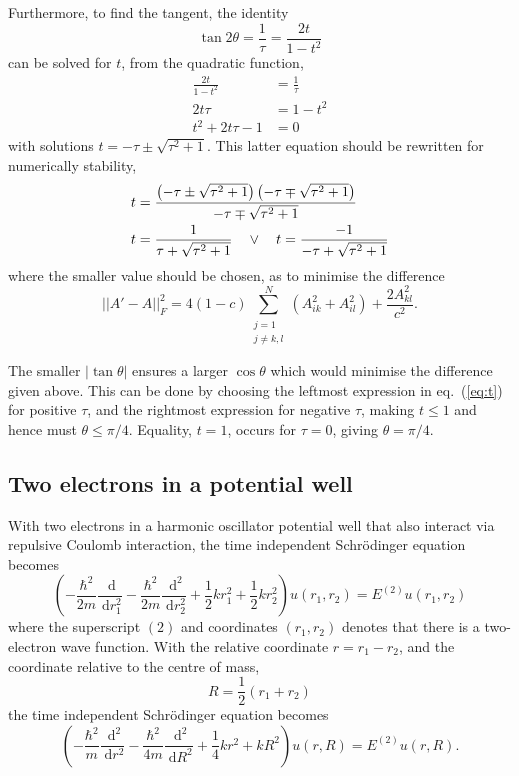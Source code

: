 \documentclass[a4paper,11pt]{article}
\newcommand{\diff}{\ensuremath{\; \text{d}}}
\begin{document}
Furthermore, to find the tangent, the identity
\[ \tan 2\theta = \frac{1}{\tau} = \frac{2 t}{1 - t^2} \]
can be solved for $t$, from the quadratic function,
\begin{align*}
    \frac{2t}{1 - t^2} &= \frac{1}{\tau}  \\
    2t\tau &= 1 - t^2 \\
    t^2 + 2t \tau - 1 &= 0
\end{align*}
with solutions $t = -\tau \pm \sqrt{\tau^2 + 1}$. This latter equation should be rewritten for numerically stability,
\begin{align}
    t &= \frac{\left( -\tau \pm \sqrt{\tau^2 + 1}\right) \left( -\tau \mp \sqrt{\tau^2 + 1} \right)}{-\tau \mp \sqrt{\tau^2 + 1} } \notag \\
    t &= \frac{1}{\tau + \sqrt{\tau^2 + 1}} \quad \lor \quad t = \frac{-1}{-\tau + \sqrt{\tau^2 + 1}}
    \label{eq:t}
\end{align}
where the smaller value should be chosen, as to minimise the difference
\[ ||A' - A||_F^2 = 4\left( 1-c \right) \sum\limits_{\substack{j=1\\j\neq k,l}}^N \left( A_{ik}^2 + A_{il}^2 \right) + \frac{2A^2_{kl}}{c^2}. \]

The smaller $|\tan\theta|$ ensures a larger $\cos\theta$ which would minimise the difference given above. This can be done by choosing the leftmost expression in eq.~(\ref{eq:t}) for positive $\tau$, and the rightmost expression for negative $\tau$, making $t \leq 1$ and hence must $\theta \leq \pi/4$. Equality, $t=1$, occurs for $\tau = 0$, giving $\theta = \pi/4$. 

\subsection{Two electrons in a potential well}
With two electrons in a harmonic oscillator potential well that also interact via repulsive Coulomb interaction, the time independent Schr\"{o}dinger equation becomes
\begin{equation}
    \left( -\frac{\hbar^2}{2m} \frac{\diff}{\diff r_1^2} - \frac{\hbar^2}{2m} \frac{\diff^2}{\diff r_2^2} + \frac{1}{2} kr_1^2 + \frac{1}{2} kr_2^2 \right) u\left( r_1, r_2 \right) = E^{(2)} u\left( r_1, r_2 \right)
    \label{eq:se2el}
\end{equation}
where the superscript $(2)$ and coordinates $(r_1, r_2)$ denotes that there is a two-electron wave function. With the relative coordinate $r = r_1 - r_2$, and the coordinate relative to the centre of mass,
\[ R = \frac{1}{2} \left( r_1 + r_2 \right) \]
the time independent Schr\"{o}dinger equation becomes
\[ \left( -\frac{\hbar^2}{m}\frac{\diff^2}{\diff r^2} - \frac{\hbar^2}{4m}\frac{\diff^2}{\diff R^2} + \frac{1}{4}kr^2 + kR^2 \right) u(r,R) = E^{(2)} u(r,R). \]
\end{document}
